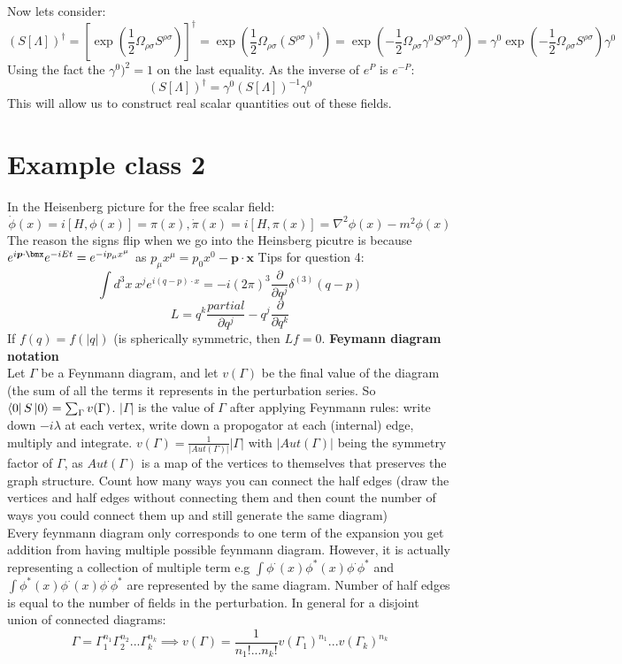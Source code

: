 \documentclass[12pt, a4paper, twoside, titlepage]{article}
\begin{document}
Now lets consider:
$$
(S[\Lambda])^{\dagger} = [\exp( \frac{1}{2} \Omega_{\rho \sigma} S^{\rho \sigma})]^{\dagger} = \exp(\frac{1}{2} \Omega_{\rho \sigma} (S^{\rho \sigma})^{\dagger}) = \exp( - \frac{1}{2} \Omega_{\rho \sigma} \gamma^0 S^{\rho \sigma} \gamma^0) = \gamma^0 \exp(- \frac{1}{2} \Omega_{\rho \sigma} S^{\rho \sigma}) \gamma^0
$$
Using the fact the $\gamma^0)^2 = 1$ on the last equality. As the inverse of $e^P $ is $e^{-P}$:
\begin{equation}
        (S[\Lambda])^{\dagger} = \gamma^0 (S[\Lambda])^{-1} \gamma^0
\end{equation}
This will allow us to construct real scalar quantities out of these fields.
\section{Example class 2}
In the Heisenberg picture for the free scalar field:
$$
\dot \phi(x) = i [H, \phi(x)] = \pi(x), \dot \pi(x) = i [H, \pi(x)] = \nabla^2 \phi(x) - m^2 \phi(x)
$$
The reason the signs flip when we go into the Heinsberg picutre is because $e^{i\bm p \cdot \bmx} e^{-i E t} = e^{- i p_{\mu} x^{\mu}}$ as $p_{\mu} x^{\mu} = p_0 x^0 - \bm p \cdot \bm x$
Tips for question 4:
$$
\int d^3 x\> x^j e^{i(q - p) \cdot x} = -i(2\pi)^3 \frac{\partial}{\partial q^j} \delta^{(3)}(q-p)
$$
$$
L=q^k \frac{partial }{\partial q^j} - q^j \frac{\partial}{\partial q^k}
$$
If $f(q) = f(|q|)$ (is spherically symmetric, then $Lf = 0$.
\textbf{Feymann diagram notation}\\
Let $\Gamma$ be a Feynmann diagram, and let $v(\Gamma)$ be the final value of the diagram (the sum of all the terms it represents in the perturbation series. So $\bra{0}S \ket{0} = \sum_{\Gamma} v(\Gamma)$. $|\Gamma|$ is the value of $\Gamma$ after applying Feynmann rules: write down $-i\lambda$ at each vertex, write down a propogator at each (internal) edge, multiply and integrate. $v(\Gamma) = \frac{1}{|Aut(\Gamma)|} |\Gamma|$ with $|Aut(\Gamma)|$ being the symmetry factor of $\Gamma$, as $Aut(\Gamma)$ is a map of the vertices to themselves that preserves the graph structure. Count how many ways you can connect the half edges (draw the vertices and half edges without connecting them and then count the number of ways you could connect them up and still generate the same diagram)\\
Every feynmann diagram only corresponds to one term of the expansion you get addition from having multiple possible feynmann diagram. However, it is actually representing a collection of multiple term e.g $\int \phi^{\cdot}(x)\phi^*(x) \phi^{\cdot} \phi^*$ and $\int \phi^{*}(x)\phi^{\cdot}(x) \phi^{\cdot} \phi^*$ are represented by the same diagram. Number of half edges is equal to the number of fields in the perturbation. In general for a disjoint union of connected diagrams:
$$
\Gamma = \Gamma^{n_1}_1 \Gamma^{n_2}_2... \Gamma^{n_k}_k \implies v(\Gamma) = \frac{1}{n_1! ... n_k!} v(\Gamma_1)^{n_1} ... v(\Gamma_k)^{n_k}
$$
\end{document}

